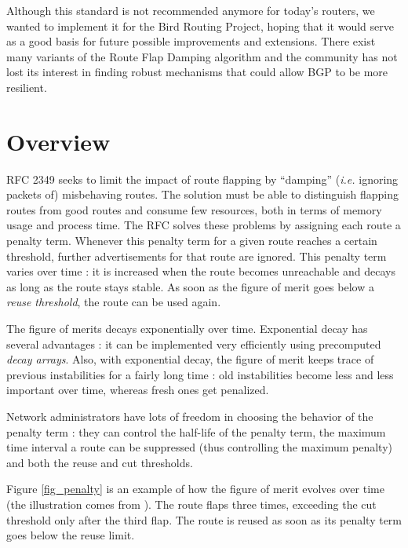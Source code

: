 \documentclass[a4paper,english]{IEEEtran}
\begin{document}
Although this standard is not recommended anymore\cite{ripe recommendations}
for today's routers, we wanted to implement it for the Bird Routing
Project\cite{bird}, hoping that it would serve as a good basis for
future possible improvements and extensions. There exist
many variants of the Route Flap Damping algorithm and the community
has not lost its interest in finding robust mechanisms that could
allow BGP to be more resilient.


\section{Overview}

RFC 2349 seeks to limit the impact of route flapping by ``damping''
(\textit{i.e.} ignoring packets of) misbehaving routes. The solution
must be able to distinguish flapping routes from good routes and consume
few resources, both in terms of memory usage and process time. The
RFC solves these problems by assigning each route a penalty term.
Whenever this penalty term for a given route reaches a certain threshold,
further advertisements for that route are ignored. This penalty term
varies over time : it is increased when the route becomes unreachable
and decays as long as the route stays stable. As soon as the figure
of merit goes below a \textit{reuse threshold}, the route can be used
again.

The figure of merits decays exponentially over time. Exponential decay
has several advantages : it can be implemented very efficiently using
precomputed \textit{decay arrays}. Also, with exponential decay, the
figure of merit keeps trace of previous instabilities for a fairly
long time : old instabilities become less and less important over
time, whereas fresh ones get penalized.

Network administrators have lots of freedom in choosing the behavior
of the penalty term : they can control the half-life of the penalty
term, the maximum time interval a route can be suppressed (thus 
controlling the maximum penalty) and both the reuse and cut thresholds.

Figure \ref{fig_penalty} is an example of how the figure of merit 
evolves over time (the illustration comes from \cite{damping-pic}).
The route flaps three times, exceeding the cut threshold only after 
the third flap. The route is reused as soon as its penalty term goes 
below the reuse limit.
\end{document}
